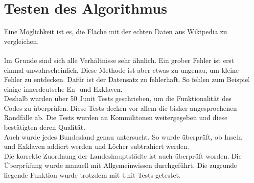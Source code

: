 \documentclass[conference]{IEEEtran}
\begin{document}
	\section{Testen des Algorithmus}
	Eine Möglichkeit ist es, die Fläche mit der echten Daten aus Wikipedia zu vergleichen.\\
	\vspace{0.2cm}
	\\
	Im Grunde sind sich alle Verhältnisse sehr ähnlich. Ein grober Fehler ist erst einmal unwahrscheinlich. Diese Methode ist aber etwas zu ungenau, um kleine Fehler zu entdecken. Dafür ist der Datensatz zu fehlerhaft. So fehlen zum Beispiel einige innerdeutsche En- und Exklaven.\\
	Deshalb wurden über 50 Junit Tests geschrieben, um die Funktionalität des Codes zu überprüfen. Diese Tests decken vor allem die bisher angesprochenen Randfälle ab. Die Tests wurden an Kommilitonen weitergegeben und diese bestätigten deren Qualität.\\
	Auch wurde jedes Bundesland genau untersucht. So wurde überprüft, ob Inseln und Exklaven addiert werden und Löcher subtrahiert werden.\\
	Die korrekte Zuordnung der Landeshauptstädte ist auch überprüft worden. Die Überprüfung wurde manuell mit Allgemeinwissen durchgeführt. Die zugrunde liegende Funktion wurde trotzdem mit Unit Tests getestet.
	
\end{document}
